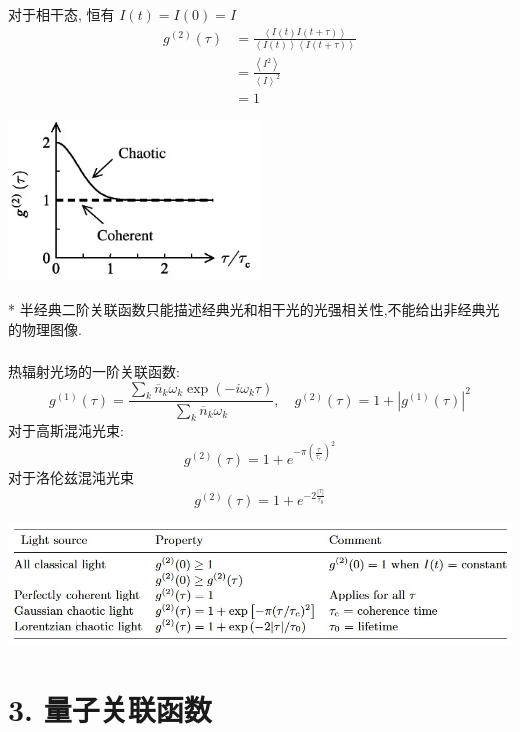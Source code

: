  \begin{frame} 
  \frametitle{}
      对于相干态, 恒有 $ I (t)= I (0) =I$ 
      \[ \begin{aligned}
        g^{(2)}(\tau) &= \frac{\left\langle I (t)  I (t+ \tau)\right\rangle}{\left\langle I (t) \right\rangle \left\langle I (t+ \tau)\right\rangle} \\ 
        &= \frac{\left\langle I^2\right\rangle}{ \left\langle I\right\rangle ^2} \\
        &= 1   
    \end{aligned}\] 
      \begin{center}
           \includegraphics[width=0.5\textwidth]{figs/2022-05-08-15-34-39.png}
      \end{center} 
    * 半经典二阶关联函数只能描述经典光和相干光的光强相关性,不能给出非经典光的物理图像.
 \end{frame}

 \begin{frame} 
  \frametitle{}
  热辐射光场的一阶关联函数:
  \[ g^{(1)}(\tau) = \frac{\sum_k \overline{n}_k \omega_k \exp{(-i \omega_k \tau)} }{\sum_k \overline{n}_k \omega_k}, \quad g^{(2)}(\tau) =1+ \left|g^{(1)}(\tau) \right|^2\]
  对于高斯混沌光束: 
       \[g^{(2)}(\tau) =1 + e^{-\pi (\frac{\tau}{\tau_c})^2 } \]
  对于洛伦兹混沌光束
       \[g^{(2)}(\tau) =1 + e^{-2 \frac{\left|\tau\right|}{\tau_0} } \]
         \begin{center}
              \includegraphics[width=1.0\textwidth]{figs/2022-05-08-16-01-24.png}
         \end{center}
 \end{frame}

\section{3. 量子关联函数}

